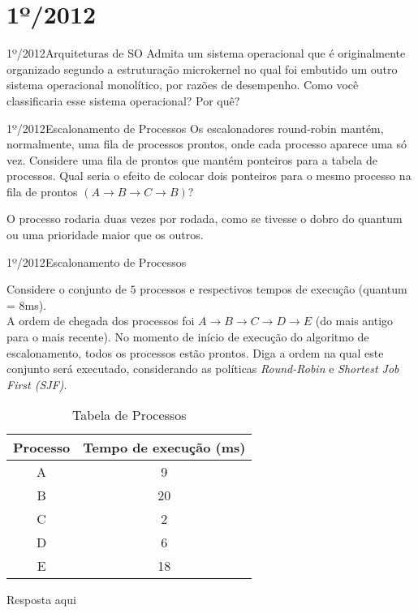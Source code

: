 




\section{1º/2012}
\begin{exercicio}
  {1º/2012}{Arquiteturas de SO}
  {Admita um sistema operacional que é originalmente organizado segundo a estruturação microkernel no qual foi embutido um outro sistema operacional monolítico, por razões de desempenho. Como você classificaria esse sistema operacional? Por quê?}
\end{exercicio}

\begin{exercicio}
  {1º/2012}{Escalonamento de Processos}
  {Os escalonadores round-robin mantém, normalmente, uma fila de processos prontos, onde cada processo aparece uma só vez. Considere uma fila de prontos que mantém ponteiros para a tabela de processos. Qual seria o efeito de colocar dois ponteiros para o mesmo processo na fila de prontos $(A \rightarrow B \rightarrow C \rightarrow B)$?
  }

  O processo rodaria duas vezes por rodada, como se tivesse o dobro do quantum ou uma prioridade maior que os outros.
\end{exercicio}

\begin{exercicio}
  {1º/2012}{Escalonamento de Processos}
  {Considere o conjunto de $5$ processos e respectivos tempos de execução (quantum = $8$ms). \\
  A ordem de chegada dos processos foi $A \rightarrow B \rightarrow C \rightarrow D \rightarrow E$ (do mais antigo para o mais recente). No momento de início de execução do algoritmo de escalonamento, todos os processos estão prontos. Diga a ordem na qual este conjunto será executado, considerando as políticas \textit{Round-Robin} e \textit{Shortest Job First (SJF)}.
  \begin{table}[!h]
      \centering
      \begin{tabular}{cc}
        \hline \hline
        \textbf{Processo} & \textbf{Tempo de execução (ms)} \\ \hline
        A                 & 9                               \\
        B                 & 20                              \\
        C                 & 2                               \\
        D                 & 6                               \\
        E                 & 18                              \\
        \hline \hline
      \end{tabular}
      \caption{Tabela de Processos}
      \label{tab:ex3}
    \end{table}
  }

  Resposta aqui
\end{exercicio}

